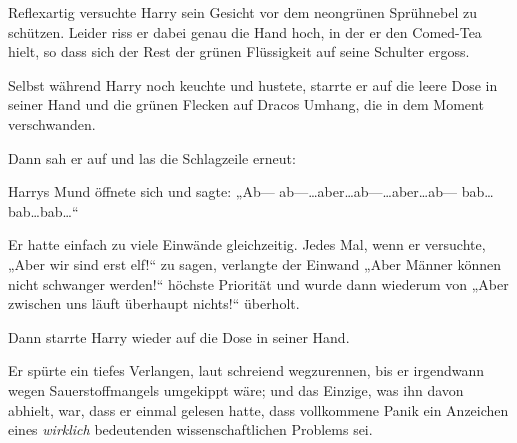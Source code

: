 Reflexartig versuchte Harry sein Gesicht vor dem neongrünen Sprühnebel zu schützen. Leider riss er dabei genau die Hand hoch, in der er den Comed-Tea hielt, so dass sich der Rest der grünen Flüssigkeit auf seine Schulter ergoss.

Selbst während Harry noch keuchte und hustete, starrte er auf die leere Dose in seiner Hand und die grünen Flecken auf Dracos Umhang, die in dem Moment verschwanden.

Dann sah er auf und las die Schlagzeile erneut:


Harrys Mund öffnete sich und sagte: „Ab— ab—…aber…ab—…aber…ab— bab…bab…bab…“

Er hatte einfach zu viele Einwände gleichzeitig. Jedes Mal, wenn er versuchte, „Aber wir sind erst elf!“ zu sagen, verlangte der Einwand „Aber Männer können nicht schwanger werden!“ höchste Priorität und wurde dann wiederum von „Aber zwischen uns läuft überhaupt nichts!“ überholt.

Dann starrte Harry wieder auf die Dose in seiner Hand.

Er spürte ein tiefes Verlangen, laut schreiend wegzurennen, bis er irgendwann wegen Sauerstoffmangels umgekippt wäre; und das Einzige, was ihn davon abhielt, war, dass er einmal gelesen hatte, dass vollkommene Panik ein Anzeichen eines \emph{wirklich} bedeutenden wissenschaftlichen Problems sei.

